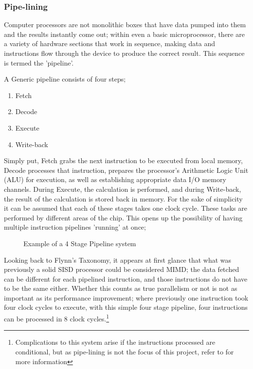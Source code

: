\subsubsection{Pipe-lining}
Computer processors are not monolithic boxes that have data pumped into them and the results instantly come out; within even a basic microprocessor, there are a variety of hardware sections that work in sequence, making data and instructions flow through the device to produce the correct result. This sequence is termed the 'pipeline'.

A Generic pipeline consists of four steps;
\begin{enumerate}
  \item Fetch
  \item Decode
  \item Execute
  \item Write-back
\end{enumerate}

Simply put, Fetch grabs the next instruction to be executed from local memory, Decode processes that instruction, prepares the processor's Arithmetic Logic Unit (ALU) for execution, as well as establishing appropriate data I/O memory channels. During Execute, the calculation is performed, and during Write-back, the result of the calculation is stored back in memory. For the sake of simplicity it can be assumed that each of these stages takes one clock cycle.
These tasks are performed by different areas of the chip. This opens up the possibility of having multiple instruction pipelines 'running' at once; 

\begin{figure}[h!]
  \centering
  \caption{Example of a 4 Stage Pipeline system}
  \label{fig:Pipeline}
\end{figure}

Looking back to Flynn's Taxonomy, it appears at first glance that what was previously a solid SISD processor could be considered MIMD; the data fetched can be different for each pipelined instruction, and those instructions do not have to be the same either. Whether this counts as true parallelism or not is not as important as its performance improvement; where previously one instruction took four clock cycles to execute, with this simple four stage pipeline, four instructions can be processed in 8 clock cycles.\footnote{Complications to this system arise if the instructions processed are conditional, but as pipe-lining is not the focus of this project, refer to \cite{Yeh91} for more information}

